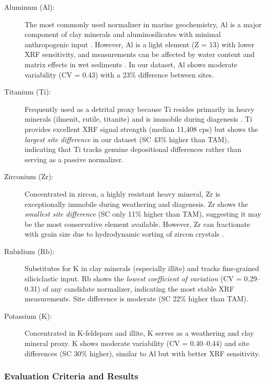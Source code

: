 \begin{description}
\item[Aluminum (Al):] The most commonly used normalizer in marine geochemistry, Al is a major component of clay minerals and aluminosilicates with minimal anthropogenic input \citep{Loring1991}. However, Al is a light element (Z = 13) with lower XRF sensitivity, and measurements can be affected by water content and matrix effects in wet sediments \citep{Lowemark2011}. In our dataset, Al shows moderate variability (CV = 0.43) with a 23\% difference between sites.

\item[Titanium (Ti):] Frequently used as a detrital proxy because Ti resides primarily in heavy minerals (ilmenit, rutile, titanite) and is immobile during diagenesis \citep{Calvert2007}. Ti provides excellent XRF signal strength (median 11,408 cps) but shows the \textit{largest site difference} in our dataset (SC 43\% higher than TAM), indicating that Ti tracks genuine depositional differences rather than serving as a passive normalizer.

\item[Zirconium (Zr):] Concentrated in zircon, a highly resistant heavy mineral, Zr is exceptionally immobile during weathering and diagenesis. Zr shows the \textit{smallest site difference} (SC only 11\% higher than TAM), suggesting it may be the most conservative element available. However, Zr can fractionate with grain size due to hydrodynamic sorting of zircon crystals \citep{Kryc2003}.

\item[Rubidium (Rb):] Substitutes for K in clay minerals (especially illite) and tracks fine-grained siliciclastic input. Rb shows the \textit{lowest coefficient of variation} (CV = 0.29--0.31) of any candidate normalizer, indicating the most stable XRF measurements. Site difference is moderate (SC 22\% higher than TAM).

\item[Potassium (K):] Concentrated in K-feldspars and illite, K serves as a weathering and clay mineral proxy. K shows moderate variability (CV = 0.40--0.44) and site differences (SC 30\% higher), similar to Al but with better XRF sensitivity.
\end{description}

\subsubsection{Evaluation Criteria and Results}

